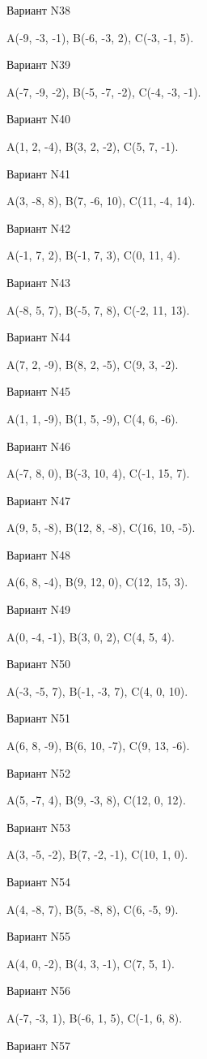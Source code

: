 \documentclass[11pt]{report}
\begin{document}
Вариант N38

A(-9, -3, -1), B(-6, -3, 2), C(-3, -1, 5).

Вариант N39

A(-7, -9, -2), B(-5, -7, -2), C(-4, -3, -1).

Вариант N40

A(1, 2, -4), B(3, 2, -2), C(5, 7, -1).

Вариант N41

A(3, -8, 8), B(7, -6, 10), C(11, -4, 14).

Вариант N42

A(-1, 7, 2), B(-1, 7, 3), C(0, 11, 4).

Вариант N43

A(-8, 5, 7), B(-5, 7, 8), C(-2, 11, 13).

Вариант N44

A(7, 2, -9), B(8, 2, -5), C(9, 3, -2).

Вариант N45

A(1, 1, -9), B(1, 5, -9), C(4, 6, -6).

Вариант N46

A(-7, 8, 0), B(-3, 10, 4), C(-1, 15, 7).

Вариант N47

A(9, 5, -8), B(12, 8, -8), C(16, 10, -5).

Вариант N48

A(6, 8, -4), B(9, 12, 0), C(12, 15, 3).

Вариант N49

A(0, -4, -1), B(3, 0, 2), C(4, 5, 4).

Вариант N50

A(-3, -5, 7), B(-1, -3, 7), C(4, 0, 10).

Вариант N51

A(6, 8, -9), B(6, 10, -7), C(9, 13, -6).

Вариант N52

A(5, -7, 4), B(9, -3, 8), C(12, 0, 12).

Вариант N53

A(3, -5, -2), B(7, -2, -1), C(10, 1, 0).

Вариант N54

A(4, -8, 7), B(5, -8, 8), C(6, -5, 9).

Вариант N55

A(4, 0, -2), B(4, 3, -1), C(7, 5, 1).

Вариант N56

A(-7, -3, 1), B(-6, 1, 5), C(-1, 6, 8).

Вариант N57
\end{document}
